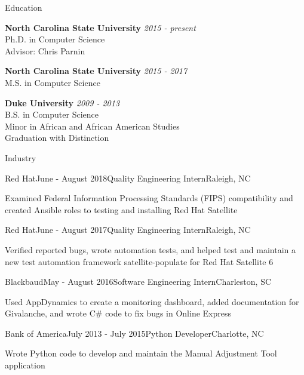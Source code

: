 \documentclass{resume} %
\begin{document}

\begin{rSection}{Education}

{\bf North Carolina State University} \hfill {\em 2015 - present} \\ 
Ph.D. in Computer Science \\
Advisor: Chris Parnin

{\bf North Carolina State University} \hfill {\em 2015 - 2017} \\ 
M.S. in Computer Science

{\bf Duke University} \hfill {\em 2009 - 2013} \\ 
B.S. in Computer Science \\
Minor in African and African American Studies \\
Graduation with Distinction
\end{rSection}


\begin{rSection}{Industry}

\begin{rSubsection}{Red Hat}{June - August 2018}{Quality Engineering Intern}{Raleigh, NC}
\item Examined Federal Information Processing Standards (FIPS) compatibility and created Ansible roles to testing and installing Red Hat Satellite
\end{rSubsection}

\begin{rSubsection}{Red Hat}{June - August 2017}{Quality Engineering Intern}{Raleigh, NC}
\item Verified reported bugs, wrote automation tests, and helped test and maintain a new test automation framework satellite-populate for Red Hat Satellite 6
\end{rSubsection}


\begin{rSubsection}{Blackbaud}{May - August 2016}{Software Engineering Intern}{Charleston, SC}
\item Used AppDynamics to create a monitoring dashboard, added documentation for Givalanche, and wrote C\# code to fix bugs in Online Express
\end{rSubsection}


\begin{rSubsection}{Bank of America}{July 2013 - July 2015}{Python Developer}{Charlotte, NC}
\item  Wrote Python code to develop and maintain the Manual Adjustment Tool application
\end{rSubsection}

\end{rSection}
\end{document}
